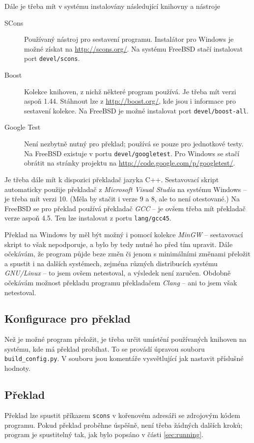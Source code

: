 \documentclass{article}
\begin{document}
Dále je třeba mít v systému instalovány následující knihovny a nástroje\begin{description}
\item[SCons] Používaný nástroj pro sestavení programu. Instalátor pro Windows je možné získat na
\url{http://scons.org/}. Na systému FreeBSD stačí instalovat port \texttt{devel/scons}.
\item[Boost] Kolekce knihoven, z nichž některé program používá. Je třeba mít verzi aspoň 1.44. Stáhnout lze z
\url{http://boost.org/}, kde jsou i informace pro sestavení kolekce. Na FreeBSD je možné instalovat port
\texttt{devel/boost-all}.
\item[Google Test] Není nezbytně nutný pro překlad; používá se pouze pro jednotkové testy. Na FreeBSD existuje v portu
\texttt{devel/googletest}. Pro Windows se stačí obrátit na stránky projektu na
\url{http://code.google.com/p/googletest/}.
\end{description}

Je třeba dále mít k dispozici překladač jazyka C++. Sestavovací skript automaticky použije překladač z \emph{Microsoft
Visual Studia} na systému Windows -- je třeba mít verzi 10. (Měla by stačit i verze 9 a 8, ale to není otestované.) Na
FreeBSD se pro překlad používá překladač \emph{GCC} -- je ovšem třeba mít překladač verze aspoň 4.5. Ten lze instalovat
z portu \texttt{lang/gcc45}.

Překlad na Windows by měl být možný i pomocí kolekce \emph{MinGW} -- sestavovací skript to však nepodporuje, a bylo by
tedy nutné ho před tím upravit. Dále očekávám, že program půjde beze změn či jenom s minimálními změnami přeložit a
spustit i na dalších systémech, zejména různých distribucích systému \emph{GNU/Linux} -- to jsem ovšem netestoval, a
výsledek není zaručen. Obdobně očekávám možnost překladu programu překladačem \emph{Clang} -- ani to jsem však
netestoval.

\subsection{Konfigurace pro překlad}
Než je možné program přeložit, je třeba určit umístění používaných knihoven na systému, kde má překlad probíhat. To se
provádí úpravou souboru \texttt{build\_config.py}. V souboru jsou komentáře vysvětlující jak nastavit příslušné hodnoty.

\subsection{Překlad}
Překlad lze spustit příkazem \verb+scons+ v kořenovém adresáři se zdrojovým kódem programu. Pokud překlad proběhne
úspěšně, není třeba žádných dalších kroků; program je spustitelný tak, jak bylo popsáno v části \ref{sec:running}.
\end{document}
